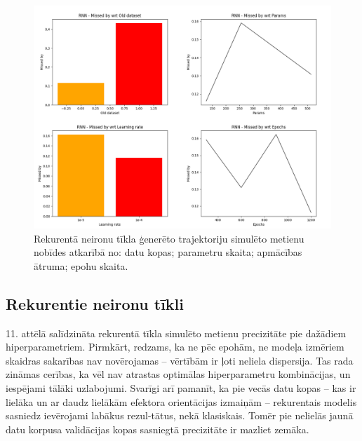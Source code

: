 \documentclass[12pt, a4paper]{article}
\numberwithin{equation}{section} %
\begin{document}
\begin{figure}[t!]
    \centering
    \includegraphics[width=16cm,page=1]{../img/rnn_missed.png}
    \caption{Rekurentā neironu tīkla ģenerēto trajektoriju simulēto metienu nobīdes atkarībā no: datu kopas; parametru skaita; apmācības ātruma; epohu skaita.}
\end{figure}

\subsection{Rekurentie neironu tīkli}

11. attēlā salīdzināta rekurentā tīkla simulēto metienu precizitāte pie dažādiem hiperparametriem. Pirmkārt, redzams, ka ne pēc epohām, ne modeļa izmēriem skaidras sakarības nav novērojamas -- vērtībām ir ļoti neliela dispersija. Tas rada zināmas cerības, ka vēl nav atrastas optimālas hiperparametru kombinācijas, un iespējami tālāki uzlabojumi. Svarīgi arī pamanīt, ka pie vecās datu kopas -- kas ir lielāka un ar daudz lielākām efektora orientācijas izmaiņām -- rekurentais modelis sasniedz ievērojami labākus rezul-tātus, nekā klasiskais. Tomēr pie nelielās jaunā datu korpusa validācijas kopas sasniegtā precizitāte ir mazliet zemāka.
\end{document}
